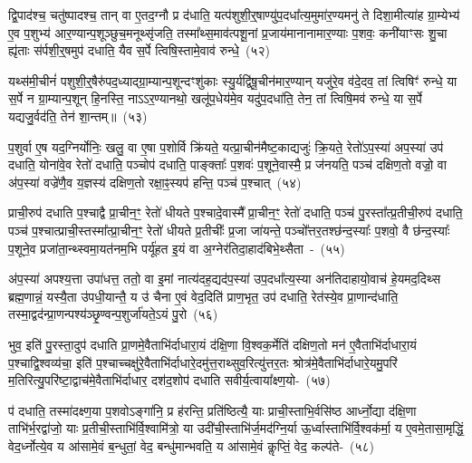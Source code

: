 द्वि॒पाद॑श्च॒ चतु॑ष्पादश्च॒ तान् वा ए॒तद॒ग्नौ प्र द॑धाति॒ यत्प॑शुशी॒र्॒\mbox{}षाण्यु॑प॒दधा᳚त्य॒मुमा॑र॒ण्यमनु॑ ते दिशा॒मीत्या॑ह ग्रा॒म्येभ्य॑ ए॒व प॒शुभ्य॑ आर॒ण्यान्प॒शूञ्छुच॒मनूथ्सृ॑जति॒ तस्मा᳚थ्स॒माव॑त्पशू॒नां प्र॒जाय॑मानानामार॒ण्याः प॒शवः॒ कनी॑याꣳसः शु॒चा ह्यृ॑ताः स॑र्पशी॒र्॒\mbox{}षमुप॑ दधाति॒ यैव स॒र्पे त्विषि॒स्तामे॒वाव॑ रुन्धे॒~(५२)\ip

यथ्स॑मी॒चीनं॑ पशुशी॒र्॒\mbox{}षैरु॑पद॒ध्याद्ग्रा॒म्यान्प॒शून्दꣳशु॑काः स्यु॒र्यद्वि॑षू॒चीन॑मार॒ण्यान् यजु॑रे॒व व॑दे॒दव॒ तां त्विषिꣳ॑ रुन्धे॒ या स॒र्पे न ग्रा॒म्यान्प॒शून् हि॒नस्ति॒ ना\-ऽऽर॒ण्यानथो॒ खलू॑प॒धेय॑मे॒व यदु॑प॒\-दधा॑ति॒ तेन॒ तां त्विषि॒मव॑ रुन्धे॒ या स॒र्पे यद्यजु॒र्वद॑ति॒ तेन॑ शा॒न्तम्॥~(५३)\ip

{\anuvakamend[{ऊ॒नान्तस्योप॑ प्रा॒णाः स्या॒दिति॒ वै प॒शवो॑ रुन्धे॒ चतु॑श्चत्वारिꣳशच्च}]}

प॒शुर्वा ए॒ष यद॒ग्निर्योनिः॒ खलु॒ वा ए॒षा प॒शोर्वि क्रि॑यते॒ यत्प्रा॒चीन॑मैष्ट॒काद्यजुः॑ क्रि॒यते॒ रेतो॑\-ऽप॒स्या॑ अप॒स्या॑ उप॑ दधाति॒ योना॑वे॒व रेतो॑ दधाति॒ पञ्चोप॑ दधाति॒ पाङ्क्ताः᳚ प॒शवः॑ प॒शूने॒वास्मै॒ प्र ज॑नयति॒ पञ्च॑ दक्षिण॒तो वज्रो॒ वा अ॑प॒स्या॑ वज्रे॑णै॒व य॒ज्ञस्य॑ दक्षिण॒तो रक्षा॒ꣴ॒स्यप॑ हन्ति॒ पञ्च॑ प॒श्चात्~(५४)\ip

प्राची॒रुप॑ दधाति प॒श्चाद्वै प्रा॒चीन॒ꣳ॒ रेतो॑ धीयते प॒श्चादे॒वास्मै᳚ प्रा॒चीन॒ꣳ॒ रेतो॑ दधाति॒ पञ्च॑ पु॒रस्ता᳚त्प्र॒तीची॒रुप॑ दधाति॒ पञ्च॑ प॒श्चात्प्राची॒स्तस्मा᳚त्प्रा॒चीन॒ꣳ॒ रेतो॑ धीयते प्र॒तीचीः᳚ प्र॒जा जा॑यन्ते॒ पञ्चो᳚त्तर॒तश्छ॑न्द॒स्याः᳚ प॒शवो॒ वै छ॑न्द॒स्याः᳚ प॒शूने॒व प्रजा॑ता॒न्थ्स्वमा॒यत॑नम॒भि पर्यू॑हत इ॒यं वा अ॒ग्नेर॑तिदा॒हाद॑बिभे॒थ्सैता~-~(५५)\ip

अ॑प॒स्या॑ अपश्य॒त्ता उपा॑धत्त॒ ततो॒ वा इ॒मां नात्य॑दह॒द्यद॑प॒स्या॑ उप॒दधा᳚त्य॒स्या अन॑ति\-दाहा\-यो॒वाच॑ हे॒यमद॒दिथ्स ब्रह्म॒णान्नं॒ यस्यै॒ता उ॑पधी॒यान्तै॒ य उ॑ चैना ए॒वं वेद॒दिति॑ प्राण॒भृत॒ उप॑ दधाति॒ रेत॑स्ये॒व प्रा॒णान्द॑धाति॒ तस्मा॒द्वद॑न्प्रा॒णन्पश्य॑ञ्छृ॒ण्वन्प॒शुर्जा॑यते॒\-ऽयं पु॒रो~(५६)\ip

भुव॒ इति॑ पु॒रस्ता॒दुप॑ दधाति प्रा॒णमे॒वैताभि॑र्दाधारा॒यं द॑क्षि॒णा वि॒श्वक॒र्मेति॑ दक्षिण॒तो मन॑ ए॒वैताभि॑र्दाधारा॒यं प॒श्चाद्वि॒श्वव्य॑चा॒ इति॑ प॒श्चाच्चक्षु॑रे॒वैताभि॑र्दाधारे॒दमु॑त्त॒राथ्सुव॒रित्यु॑त्तर॒तः श्रोत्र॑मे॒वैताभि॑र्दाधारे॒यमु॒परि॑ म॒तिरित्यु॒परि॑ष्टा॒द्वाच॑मे॒वैताभि॑र्दाधार॒ दश॑द॒शोप॑ दधाति सवीर्य॒त्वाया᳚क्ष्ण॒यो-~(५७)\ip

प॑ दधाति॒ तस्मा॑दक्ष्ण॒या प॒शवो\-ऽङ्गा॑नि॒ प्र ह॑रन्ति॒ प्रति॑ष्ठित्यै॒ याः प्राची॒स्ताभि॒र्वसि॑ष्ठ आर्ध्नो॒द्या द॑क्षि॒णा ताभि॑र्भ॒रद्वा॑जो॒ याः प्र॒तीची॒स्ताभि॑र्वि॒श्वामि॑त्रो॒ या उदी॑ची॒स्ताभि॑र्ज॒मद॑ग्नि॒र्या ऊ॒र्ध्वास्ताभि॑र्वि॒श्वक॑र्मा॒ य ए॒वमे॒तासा॒मृद्धिं॒ वेद॒र्ध्नोत्ये॒व य आ॑सामे॒वं ब॒न्धुतां॒ वेद॒ बन्धु॑मान्भवति॒ य आ॑सामे॒वं कॢप्तिं॒ वेद॒ कल्प॑ते-~(५८)\ip

